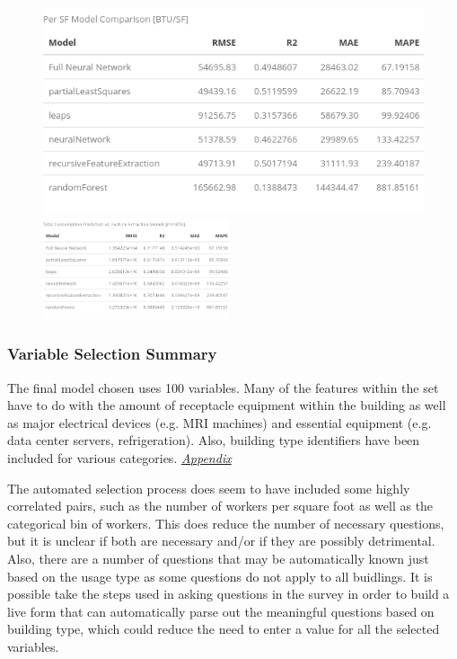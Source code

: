 \begin{figure}[h]
\centering
\includegraphics[width=.49\textwidth, height=0.25\textheight]{Images/electricity_psf_model_summary.png}
\includegraphics[width=0.49\textwidth, height=0.25\textheight]{Images/electricity_psf_model_summary_transformed.png}
\end{figure}


\subsubsection{Variable Selection Summary}
The final model chosen uses 100 variables.  Many of the features within the set have to do with the amount of receptacle equipment within the building as well as major electrical devices (e.g. MRI machines) and essential equipment (e.g. data center servers, refrigeration).  Also, building type identifiers have been included for various categories. \textit{\hyperref[appendix_nn:electricity:nn_full_variables]{Appendix}}

The automated selection process does seem to have included some highly correlated pairs, such as the number of workers per square foot as well as the categorical bin of workers.  This does reduce the number of necessary questions, but it is unclear if both are necessary and/or if they are possibly detrimental.  Also, there are a number of questions that may be automatically known just based on the usage type as some questions do not apply to all buidlings.  It is possible take the steps used in asking questions in the survey in order to build a live form that can automatically parse out the meaningful questions based on building type, which could reduce the need to enter a value for all the selected variables.

